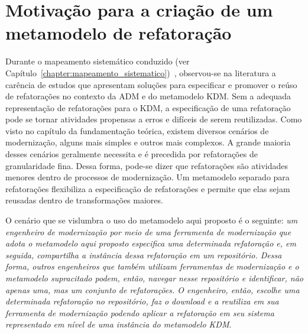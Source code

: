 \section{Motivação para a criação de um metamodelo de refatoração} %
\label{sec:motiva_o_para_a_cria_o_de_um_meta_modelo_de_refatora_o}

Durante o mapeamento sistemático conduzido (ver Capítulo~\ref{chapter:mapeamento_sistematico})~\cite{durelli_systematic_mapping}, observou-se na literatura a carência de estudos que apresentam soluções para especificar e promover o reúso de refatorações no contexto da ADM e do metamodelo KDM. Sem a adequada representação de refatorações para o KDM, a especificação de uma refatoração pode se tornar atividades propensas a erros e difíceis de serem reutilizadas. Como visto no capítulo da fundamentação teórica, existem diversos cenários de modernização, alguns mais simples e outros mais complexos. A grande maioria desses cenários geralmente necessita e é precedida por refatorações de granularidade fina. Dessa forma, pode-se dizer que refatorações são atividades menores dentro de processos de modernização. Um metamodelo separado para refatorações flexibiliza a especificação de refatorações e permite que elas sejam reusadas dentro de transformações maiores.

O cenário que se vislumbra o uso do metamodelo aqui proposto é o seguinte: \textit{um engenheiro de modernização por meio de uma ferramenta de modernização que adota o metamodelo aqui proposto especifica uma determinada refatoração e, em seguida, compartilha a instância dessa refatoração em um repositório. Dessa forma, outros engenheiros que também utilizam ferramentas de modernização e o metamodelo supracitado podem, então, navegar nesse repositório e identificar, não apenas uma, mas um conjunto de refatorações. O engenheiro, então, escolhe uma determinada refatoração no repositório, faz o \textit{download} e a reutiliza em sua ferramenta de modernização podendo aplicar a refatoração em seu sistema representado em nível de uma instância do metamodelo KDM}. 


